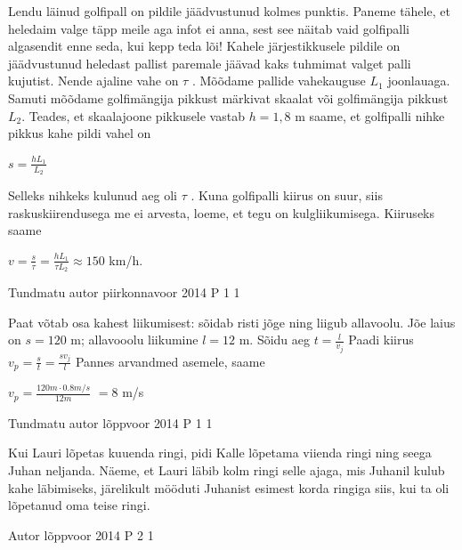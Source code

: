 \documentclass[11pt]{article}
\begin{document}
{{\ifSolution
Lendu läinud golfipall on pildile jäädvustunud kolmes punktis. Paneme tähele, et heledaim valge täpp meile aga infot ei anna, sest see näitab vaid golfipalli algasendit enne seda, kui kepp teda lõi! Kahele järjestikkusele pildile on jäädvustunud heledast pallist paremale jäävad kaks tuhmimat valget palli kujutist. Nende ajaline vahe on $\tau$ . Mõõdame pallide vahekauguse $L_1$ joonlauaga. Samuti mõõdame golfimängija pikkust märkivat skaalat või golfimängija pikkust $L_2$. Teades, et skaalajoone pikkusele vastab $h = 1,8$ m saame, et golfipalli nihke pikkus kahe pildi vahel on
\begin{center}
$s = \frac{hL_1}{L_2}$
\end{center}
Selleks nihkeks kulunud aeg oli $\tau$ . Kuna golfipalli kiirus on suur, siis raskuskiirendusega me ei arvesta, loeme, et tegu on kulgliikumisega. Kiiruseks saame
\begin{center}
$v = \frac{s}{\tau} = \frac{hL_1}{\tau L_2} \approx 150$ km/h.
\end{center}
\fi
}


{Tundmatu autor} %
{piirkonnavoor} %
{2014} %
{P 1} %
{1} %
{

\ifSolution
Paat võtab osa kahest liikumisest: sõidab risti jõge ning liigub allavoolu. Jõe laius on $s = 120$ m; allavooolu liikumine $l = 12$ m.
\newline
Sõidu aeg $t = \frac{l}{v_j}$
\newline
Paadi kiirus $v_p = \frac {s}{t} = \frac {s v_j}{l}$
\newline
Pannes arvandmed asemele, saame
\begin{center}
$v_p = \frac{120 m \cdot 0.8 m/s}{12 m}$ $=8$ m/s
\end{center}
\fi
}

{Tundmatu autor} %
{lõppvoor} %
{2014} %
{P 1} %
{1} %
{

\ifSolution
Kui Lauri lõpetas kuuenda ringi, pidi Kalle lõpetama viienda ringi ning seega Juhan neljanda. Näeme, et Lauri läbib kolm ringi selle ajaga, mis Juhanil kulub kahe läbimiseks, järelikult mööduti Juhanist esimest korda ringiga siis, kui ta oli lõpetanud oma teise ringi.
\fi
}



{Autor} %
{lõppvoor} %
{2014} %
{P 2} %
{1} %
{

}}
\end{document}
